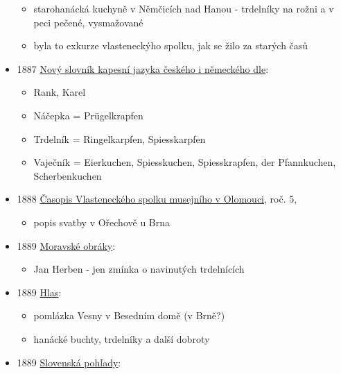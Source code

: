 \begin{itemize}
  \begin{itemize}
  \tightlist
  \item
    starohanácká kuchyně v Němčicích nad Hanou - trdelníky na rožni a v
    peci pečené, vysmažované
  \item
    byla to exkurze vlasteneckýho spolku, jak se žilo za starých časů
  \end{itemize}
\item
  1887
  \href{https://ceskadigitalniknihovna.cz/uuid/uuid:cac319e0-dea6-11e6-9964-005056825209}{Nový
  slovník kapesní jazyka českého i německého dle}:

  \begin{itemize}
  \tightlist
  \item
    Rank, Karel
  \item
    Náčepka = Prügelkrapfen
  \item
    Trdelník = Ringelkarpfen, Spiesskarpfen
  \item
    Vaječník = Eierkuchen, Spiesskuchen, Spiesskrapfen, der Pfannkuchen,
    Scherbenkuchen
  \end{itemize}
\item
  1888
  \href{https://ndk.cz/view/uuid:8d89f8c0-abdb-11dd-ae2a-000d606f5dc6?page=uuid\%3Afbdf17f0-247b-11e9-90cf-5ef3fc9bb22f}{Časopis
  Vlasteneckého spolku musejního v Olomouci}, roč. 5,

  \begin{itemize}
  \tightlist
  \item
    popis svatby v Ořechově u Brna
  \end{itemize}
\item
  1889
  \href{https://ndk.cz/view/uuid:df0f4040-895f-11dd-a7d7-000d606f5dc6?page=uuid\%3A1bb49280-82c0-11e7-94b3-005056825209&fulltext=trdeln\%C3\%ADky}{Moravské
  obráky}:

  \begin{itemize}
  \tightlist
  \item
    Jan Herben - jen zmínka o navinutých trdelnících
  \end{itemize}
\item
  1889
  \href{https://www.digitalniknihovna.cz/vkol/uuid/uuid:3a12df2c-c1ab-42a4-a423-5746952a0111}{Hlas}:

  \begin{itemize}
  \tightlist
  \item
    pomlázka Vesny v Besedním domě (v Brně?)
  \item
    hanácké buchty, trdelníky a další dobroty
  \end{itemize}
\item
  1889
  \href{https://dikda.snk.sk/view/uuid:1ecf9029-7613-401d-843c-e2938a484970?page=uuid:43b26cf7-af4a-4231-8901-ba41c009c9e7&fulltext=trdeln\%C3\%ADk\%20OR\%20trdeln\%C3\%ADka\%20OR\%20trdeln\%C3\%ADku}{Slovenská
  pohľady}:


\end{itemize}
